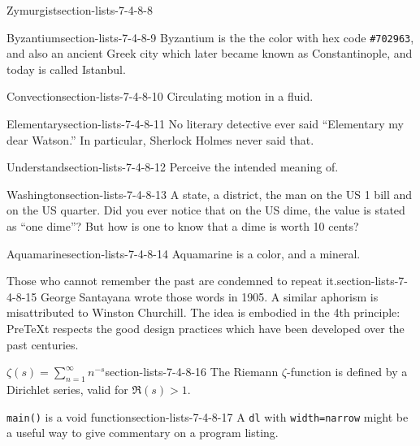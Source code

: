 \documentclass{amsart}
\theoremstyle{plain}%
\theoremstyle{definition}%
\theoremstyle{remark}%
\newcommand{\mono}[1]{\texttt{#1}}
\numberwithin{equation}{section}
\begin{document}
\begin{descriptionlist}
\begin{dlinarrow}{Zymurgist}{section-lists-7-4-8-8}
\end{dlinarrow}%
\begin{dlinarrow}{Byzantium}{section-lists-7-4-8-9}%
Byzantium is the the color with hex code \mono{\#702963}, and also an ancient Greek city which later became known as Constantinople, and today is called Istanbul.%
\end{dlinarrow}%
\begin{dlinarrow}{Convection}{section-lists-7-4-8-10}%
Circulating motion in a fluid.%
\end{dlinarrow}%
\begin{dlinarrow}{Elementary}{section-lists-7-4-8-11}%
No literary detective ever said ``Elementary my dear Watson.''  In particular, Sherlock Holmes never said that.%
\end{dlinarrow}%
\begin{dlinarrow}{Understand}{section-lists-7-4-8-12}%
Perceive the intended meaning of.%
\end{dlinarrow}%
\begin{dlinarrow}{Washington}{section-lists-7-4-8-13}%
A state, a district, the man on the US \textdollar{}1 bill and on the US quarter. Did you ever notice that on the US dime, the value is stated as ``one dime''? But how is one to know that a dime is worth 10 cents?%
\end{dlinarrow}%
\begin{dlinarrow}{Aquamarine}{section-lists-7-4-8-14}%
Aquamarine is a color, and a mineral.%
\end{dlinarrow}%
\begin{dlinarrow}{Those who cannot remember the past are condemned to repeat it.}{section-lists-7-4-8-15}%
George Santayana wrote those words in 1905.  A similar aphorism is misattributed to Winston Churchill.  The idea is embodied in the 4th principle: PreTeXt respects the good design practices which have been developed over the past centuries.%
\end{dlinarrow}%
\begin{dlinarrow}{\(\displaystyle \zeta(s) = \sum_{n=1}^\infty n^{-s} \)}{section-lists-7-4-8-16}%
The Riemann \(\zeta\)-function is defined by a Dirichlet series, valid for \(\Re(s) > 1\).%
\end{dlinarrow}%
\begin{dlinarrow}{\mono{main()} is a void function}{section-lists-7-4-8-17}%
A \mono{dl} with \mono{width=\textquotedbl{}narrow\textquotedbl{}} might be a useful way to give commentary on a program listing.%
\end{dlinarrow}%
\end{descriptionlist}
\end{document}
